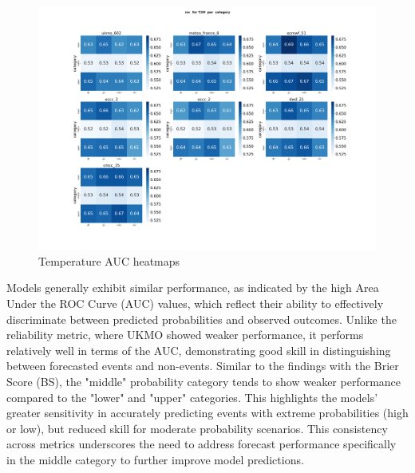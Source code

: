\begin{figure}[H]
    \centering
    \includegraphics[width=1\linewidth]{plots/prob/roc/roc_T2M_category.png}
    \caption{Temperature AUC  heatmaps }
\end{figure}


Models generally exhibit similar performance, as indicated by the high Area Under the ROC Curve (AUC) values, which reflect their ability to effectively discriminate between predicted probabilities and observed outcomes. Unlike the reliability metric, where UKMO showed weaker performance, it performs relatively well in terms of the AUC, demonstrating good skill in distinguishing between forecasted events and non-events. Similar to the findings with the Brier Score (BS), the "middle" probability category tends to show weaker performance compared to the "lower" and "upper" categories. This highlights the models' greater sensitivity in accurately predicting events with extreme probabilities (high or low), but reduced skill for moderate probability scenarios. This consistency across metrics underscores the need to address forecast performance specifically in the middle category to further improve model predictions.

